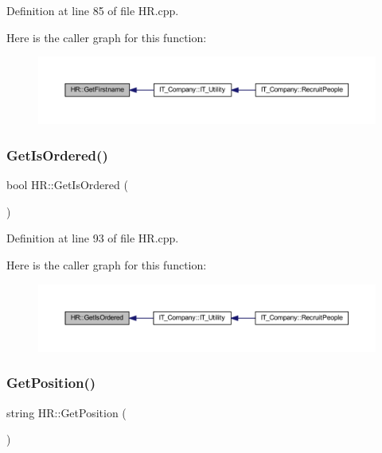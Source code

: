 Definition at line 85 of file H\+R.\+cpp.

Here is the caller graph for this function\+:
\nopagebreak
\begin{figure}[H]
\begin{center}
\leavevmode
\includegraphics[width=350pt]{class_h_r_a03a185de9601109b13c6a34c381b7b6f_icgraph}
\end{center}
\end{figure}
\mbox{\label{class_h_r_acbee31efce04c45b16cd9f24c7e2359c}} 
\subsubsection{\texorpdfstring{Get\+Is\+Ordered()}{GetIsOrdered()}}
{\footnotesize\ttfamily bool H\+R\+::\+Get\+Is\+Ordered (\begin{DoxyParamCaption}{ }\end{DoxyParamCaption})}



Definition at line 93 of file H\+R.\+cpp.

Here is the caller graph for this function\+:
\nopagebreak
\begin{figure}[H]
\begin{center}
\leavevmode
\includegraphics[width=350pt]{class_h_r_acbee31efce04c45b16cd9f24c7e2359c_icgraph}
\end{center}
\end{figure}
\mbox{\label{class_h_r_aed5b4581248646ba06467442b080c262}} 
\subsubsection{\texorpdfstring{Get\+Position()}{GetPosition()}}
{\footnotesize\ttfamily string H\+R\+::\+Get\+Position (\begin{DoxyParamCaption}{ }\end{DoxyParamCaption})}



